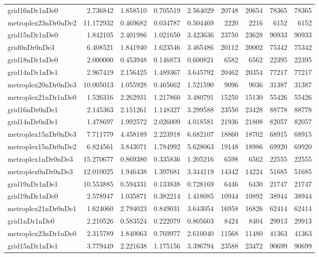 \begin{longtable}{|l|r|r|r|r|r|r|r|r|}
grid16nDr1nDe0 & 2.736842 & 1.858510 & 0.705519 & 2.564029 & 20748 & 20654 & 78365 & 78365 \\
metroplex23nDr0nDe2 & 11.172932 & 0.469682 & 0.034787 & 0.504469 & 2220 & 2216 & 6152 & 6152 \\
grid15nDr1nDe0 & 1.842105 & 2.401986 & 1.021650 & 3.423636 & 23750 & 23628 & 90933 & 90933 \\
grid0nDr0nDe3 & 6.408521 & 1.841940 & 1.623546 & 3.465486 & 20112 & 20002 & 75342 & 75342 \\
grid18nDr1nDe0 & 2.000000 & 0.453948 & 0.146873 & 0.600821 & 6582 & 6562 & 22395 & 22395 \\
grid14nDr1nDe1 & 2.967419 & 2.156425 & 1.489367 & 3.645792 & 20462 & 20354 & 77217 & 77217 \\
metroplex20nDr0nDe3 & 10.005013 & 1.055928 & 0.465662 & 1.521590 & 9096 & 9036 & 31387 & 31387 \\
metroplex21nDr1nDe0 & 1.526316 & 2.262931 & 1.217860 & 3.480791 & 15250 & 15130 & 55426 & 55426 \\
grid16nDr0nDe1 & 2.145363 & 2.151261 & 1.148327 & 3.299588 & 23550 & 23428 & 88778 & 88778 \\
grid14nDr0nDe1 & 1.478697 & 1.992572 & 2.026009 & 4.018581 & 21936 & 21808 & 82057 & 82057 \\
metroplex15nDr0nDe3 & 7.711779 & 4.458189 & 2.223918 & 6.682107 & 18860 & 18702 & 68915 & 68915 \\
metroplex15nDr0nDe2 & 6.824561 & 3.843071 & 1.784992 & 5.628063 & 19148 & 18986 & 69920 & 69920 \\
metroplex1nDr0nDe3 & 15.270677 & 0.869380 & 0.335836 & 1.205216 & 6598 & 6562 & 22555 & 22555 \\
metroplex0nDr0nDe3 & 12.010025 & 1.946438 & 1.397681 & 3.344119 & 14342 & 14224 & 51685 & 51685 \\
grid19nDr1nDe1 & 10.553885 & 0.594331 & 0.133838 & 0.728169 & 6446 & 6430 & 21747 & 21747 \\
grid19nDr1nDe0 & 2.578947 & 1.035871 & 0.382214 & 1.418085 & 10944 & 10892 & 38944 & 38944 \\
metroplex21nDr0nDe1 & 1.624060 & 2.794023 & 0.849031 & 3.643054 & 16958 & 16826 & 62414 & 62414 \\
grid1nDr1nDe0 & 2.210526 & 0.583524 & 0.222079 & 0.805603 & 8424 & 8404 & 29913 & 29913 \\
metroplex23nDr1nDe0 & 2.315789 & 1.840063 & 0.769977 & 2.610040 & 11568 & 11480 & 41363 & 41363 \\
grid15nDr1nDe1 & 3.779449 & 2.221638 & 1.175156 & 3.396794 & 23588 & 23472 & 90699 & 90699 \\

\end{longtable}
